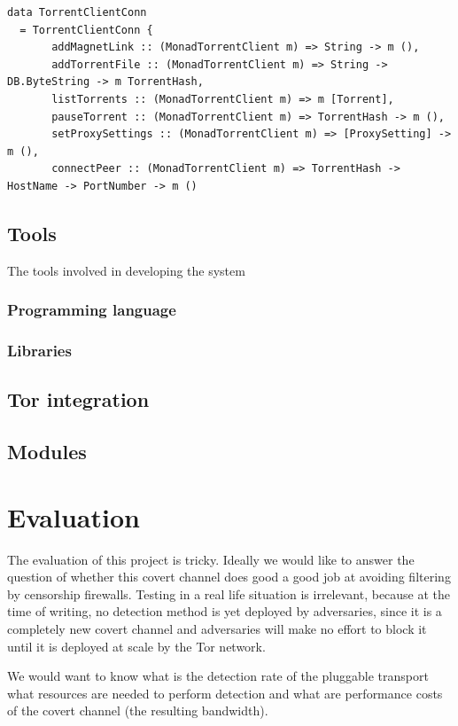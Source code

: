 \documentclass[11pt]{article} %
\begin{document}
\begin{lstlisting}
data TorrentClientConn
  = TorrentClientConn {
       addMagnetLink :: (MonadTorrentClient m) => String -> m (),
       addTorrentFile :: (MonadTorrentClient m) => String -> DB.ByteString -> m TorrentHash,
       listTorrents :: (MonadTorrentClient m) => m [Torrent],
       pauseTorrent :: (MonadTorrentClient m) => TorrentHash -> m (),
       setProxySettings :: (MonadTorrentClient m) => [ProxySetting] -> m (),
       connectPeer :: (MonadTorrentClient m) => TorrentHash -> HostName -> PortNumber -> m ()
\end{lstlisting}

\subsection{Tools}

The tools involved in developing the system

\subsubsection{Programming language}
\subsubsection{Libraries}
\subsection{Tor integration}
\subsection{Modules}

\section{Evaluation}

The evaluation of this project is tricky. Ideally we would like to answer the question of whether this covert channel does good a good job at avoiding filtering by censorship firewalls. Testing in a real life situation is irrelevant, because at the time of writing, no detection method is yet deployed by adversaries, since it is a completely new covert channel and adversaries will make no effort to block it until it is deployed at scale by the Tor network.

We would want to know what is the detection rate of the pluggable transport what resources are needed to perform detection and what are performance costs of the covert channel (the resulting bandwidth).
\end{document}
